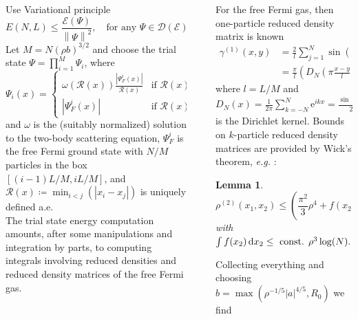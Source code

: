 \documentclass[final]{beamer}
\newcommand{\euler}[1]{\text{e}^{#1}}
\newcommand{\norm}[1]{\left\lVert #1 \right\rVert}
\newcommand{\abs}[1]{\left\lvert #1 \right\rvert}
\newcommand*\diff{\mathop{}\!\mathrm{d}}
\newcommand{\eg}{\emph{e.g.} }
\newcommand{\rr}{\mathcal{R}}
\newtheorem{mlemma}{Lemma}
\newlength{\sepwidth}
\newlength{\colwidth}
\newlength{\sepwidthh}
\newcommand{\separatorcolumnn}{\begin{column}{\sepwidthh}\end{column}}
\begin{document}
\begin{frame}[t]
\begin{columns}[t]
\begin{column}{\colwidth}
		\begin{tcolorbox}[colframe=qmathblue,colback=qmathbluelyslyslys,title=Upper bound proof sketch]
			Use Variational principle
			$$
			E(N,L)\leq \frac{\mathcal{E}(\Psi)}{\norm{\Psi}^2},\quad \text{for any }  \Psi\in \mathcal{D}(\mathcal{E}) .
			$$
			Let $ M=N(\rho b)^{3/2} $ and choose the trial state $ \Psi=\prod_{i=1}^{M}\Psi_i $, where \begin{equation}
				\Psi_i(x)=\begin{cases}
				\omega(\rr(x))\frac{\abs{\Psi^i_F(x)}}{\rr(x)}& \text{if }\rr(x)<b\\
				\abs{\Psi^i_F(x)}&\text{if }\rr(x)\geq b,
				\end{cases}
			\end{equation}
			and $ \omega $ is the (suitably normalized) solution to the two-body scattering equation,  $\Psi^i_F$ is the free Fermi ground state with $ N/M $ particles in the box $ [(i-1)L/M,iL/M] $, and $ \rr(x)\coloneqq \min_{i<j}(\abs{x_i-x_j}) $ is uniquely defined a.e.\\ The trial state energy computation amounts, after some manipulations and integration by parts, to computing integrals involving reduced densities and reduced density matrices of the free Fermi gas.
		\end{tcolorbox}\vspace{0.75cm}
		\end{column}
	\separatorcolumnn

	\begin{column}{\colwidth}
		\begin{tcolorbox}[colframe=qmathblue,colback=qmathbluelyslyslys,title=Upper bound proof sketch]
			For the free Fermi gas, then one-particle reduced density matrix is known
			\begin{equation}
			\begin{aligned}
			\gamma^{(1)}(x,y)&=\frac{2}{l}\sum_{j=1}^{N}\sin\left(\frac{\pi}{l}jx\right)\sin\left(\frac{\pi}{l} jy\right)\\
			&=\frac{\pi}{l}\left(D_{N}\left(\pi\frac{x-y}{l}\right)+D_{N}\left(\pi\frac{x+y}{l}\right)\right),
			\end{aligned}
			\end{equation}
			where $ l=L/M $ and $ D_N(x)=\frac{1}{2\pi}\sum_{k=-N}^{N}\euler{ikx}=\frac{\sin((N+1/2)x)}{2\pi\sin(x/2)} $ is the Dirichlet kernel.
			Bounds on $ k $-particle reduced density matrices are provided by Wick's theorem, \eg:
			\begin{mlemma}\label{Lemma rho2 bound}
				$$ \rho^{(2)}(x_1,x_2)\leq\left(\frac{\pi^2}{3}\rho^4+f(x_2)\right)(x_1-x_2)^2+\mathcal{O}(\rho^6(x_1-x_2)^4), $$ 
				with $ \int f(x_2)\diff x_2\leq \textnormal{ const. }\rho^3\log(N). $
			\end{mlemma}
			Collecting everything and choosing $ b=\max(\rho^{-1/5}\abs{a}^{4/5}, R_0) $ we find
			

\end{tcolorbox}
\end{column}
\end{columns}
\end{frame}
\end{document}
